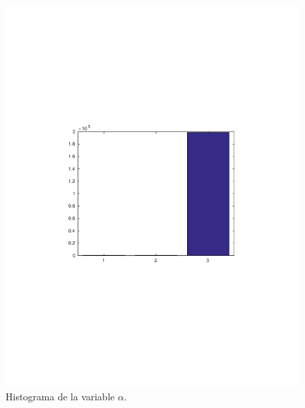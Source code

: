 \begin{figure}[H]
\begin{minipage}{0.5\textwidth}
 \centering
	\includegraphics[width=1.2\textwidth]{imgs/alpha.pdf}
	\caption{\footnotesize Histograma de la variable $\alpha$.}
\end{minipage}
\begin{minipage}{0.5\textwidth}
 \centering

\end{minipage}
\end{figure}
